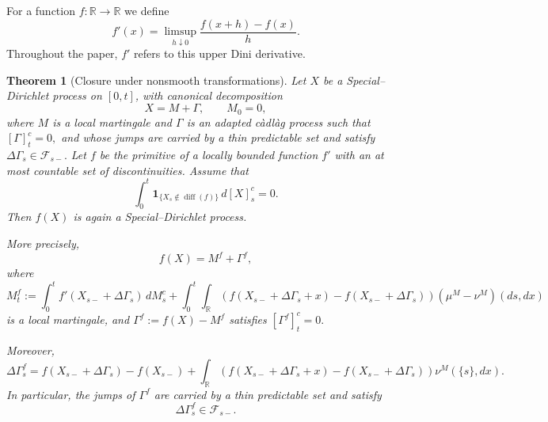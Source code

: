 \documentclass[a4paper,10pt]{article}
\newtheorem{thm}{Theorem}[section]
\begin{document}
For a function \(f:\mathbb R\to\mathbb R\) we define
\[
f'(x)
=
\limsup_{h\downarrow0}
\frac{f(x+h)-f(x)}{h}.
\]
Throughout the paper, \(f'\) refers to this upper Dini derivative.

\begin{thm}[Closure under nonsmooth transformations]
\label{thm:SD-closure}
Let \(X\) be a Special--Dirichlet process on \([0,t]\), with canonical
decomposition
\[
        X=M+\Gamma,
        \qquad M_0=0,
\]
where \(M\) is a local martingale and \(\Gamma\) is an adapted càdlàg
process such that
$
        [\Gamma]^c_t=0,
$
and whose jumps are carried by a thin predictable set and satisfy
$
        \Delta\Gamma_s\in\mathcal F_{s-}.
$
Let \(f\) be the primitive of a locally bounded function \(f'\) with an
at most countable set of discontinuities. Assume that
\[
        \int_0^t
        \mathbf 1_{\{X_s\notin\operatorname{diff}(f)\}}\,d[X]^c_s=0.
\]
Then \(f(X)\) is again a Special--Dirichlet process.

More precisely, 
\[
        f(X)=M^f+\Gamma^f,
\]
where
\[
        M^f_t
        :=
        \int_0^t f'(X_{s-}+\Delta\Gamma_s)\,dM^c_s
        +
        \int_0^t\int_{\mathbb R}
        \left(f(X_{s-}+\Delta\Gamma_s+x)-f(X_{s-}+\Delta\Gamma_s)\right)(\mu^M-\nu^M)(ds,dx)
\]
is a local martingale, and \(\Gamma^f:=f(X)-M^f\) satisfies
$
        [\Gamma^f]^c_t=0.
$

Moreover,
\[
        \Delta\Gamma^f_s
        =
        f(X_{s-}+\Delta\Gamma_s)-f(X_{s-})
        +
        \int_{\mathbb R}
        \left(f(X_{s-}+\Delta\Gamma_s+x)-f(X_{s-}+\Delta\Gamma_s)\right)\nu^M(\{s\},dx).
\]
In particular, the jumps of \(\Gamma^f\) are carried by a thin predictable
set and satisfy
\[
        \Delta\Gamma^f_s\in\mathcal F_{s-}.
\]
\end{thm}
\end{document}
